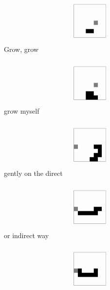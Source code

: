 \documentclass[a4paper]{article}
\begin{document}
\begin{figure}
    \centering
    \begin{subfigure}[b]{0.24\textwidth}
        \includegraphics[width=\textwidth]{qsnake_snaps/1}
        \caption{Grow, grow}
    \end{subfigure}
    \begin{subfigure}[b]{0.24\textwidth}
        \includegraphics[width=\textwidth]{qsnake_snaps/2}
        \caption{grow myself}
    \end{subfigure}
    \begin{subfigure}[b]{0.24\textwidth}
        \includegraphics[width=\textwidth]{qsnake_snaps/3}
        \caption{gently on the direct}
    \end{subfigure}
    \begin{subfigure}[b]{0.24\textwidth}
        \includegraphics[width=\textwidth]{qsnake_snaps/4}
        \caption{or indirect way}
    \end{subfigure}
    \begin{subfigure}[b]{0.24\textwidth}
        \includegraphics[width=\textwidth]{qsnake_snaps/5}

\end{subfigure}
\end{figure}
\end{document}
